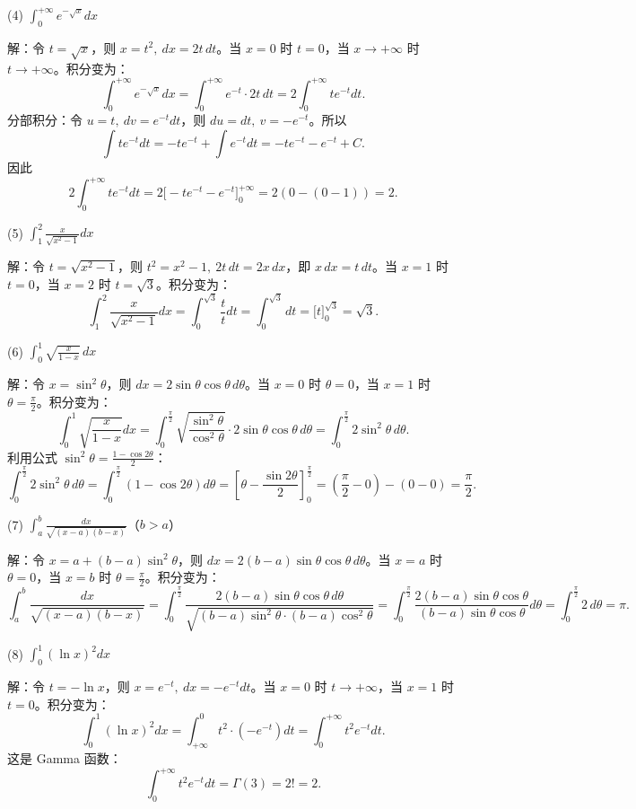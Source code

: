 (4) \(\int_{0}^{+\infty}e^{-\sqrt{x}}dx\)

解：令 \(t=\sqrt{x}\)，则 \(x=t^{2},\ dx=2t\,dt\)。当 \(x=0\) 时 \(t=0\)，当 \(x\to+\infty\) 时 \(t\to+\infty\)。积分变为：
\[ \int_{0}^{+\infty}e^{-\sqrt{x}}dx=\int_{0}^{+\infty}e^{-t}\cdot2t\,dt=2\int_{0}^{+\infty}te^{-t}dt. \]
分部积分：令 \(u=t,\ dv=e^{-t}dt\)，则 \(du=dt,\ v=-e^{-t}\)。所以
\[ \int te^{-t}dt=-te^{-t}+\int e^{-t}dt=-te^{-t}-e^{-t}+C. \]
因此
\[ 2\int_{0}^{+\infty}te^{-t}dt=2\big[-te^{-t}-e^{-t}\big]_{0}^{+\infty}=2\left(0-(0-1)\right)=2. \]

(5) \(\int_{1}^{2}\frac{x}{\sqrt{x^{2}-1}}dx\)

解：令 \(t=\sqrt{x^{2}-1}\)，则 \(t^{2}=x^{2}-1,\ 2t\,dt=2x\,dx\)，即 \(x\,dx=t\,dt\)。当 \(x=1\) 时 \(t=0\)，当 \(x=2\) 时 \(t=\sqrt3\)。积分变为：
\[ \int_{1}^{2}\frac{x}{\sqrt{x^{2}-1}}dx=\int_{0}^{\sqrt3}\frac{t}{t}dt=\int_{0}^{\sqrt3}dt=\big[t\big]_{0}^{\sqrt3}=\sqrt3. \]

(6) \(\int_{0}^{1}\sqrt{\frac{x}{1-x}}\,dx\)

解：令 \(x=\sin^{2}\theta\)，则 \(dx=2\sin\theta\cos\theta\,d\theta\)。当 \(x=0\) 时 \(\theta=0\)，当 \(x=1\) 时 \(\theta=\frac{\pi}{2}\)。积分变为：
\[ \int_{0}^{1}\sqrt{\frac{x}{1-x}}dx=\int_{0}^{\frac{\pi}{2}}\sqrt{\frac{\sin^{2}\theta}{\cos^{2}\theta}}\cdot2\sin\theta\cos\theta\,d\theta=\int_{0}^{\frac{\pi}{2}}2\sin^{2}\theta\,d\theta. \]
利用公式 \(\sin^{2}\theta=\frac{1-\cos2\theta}{2}\)：
\[ \int_{0}^{\frac{\pi}{2}}2\sin^{2}\theta\,d\theta=\int_{0}^{\frac{\pi}{2}}(1-\cos2\theta)d\theta=\left[\theta-\frac{\sin2\theta}{2}\right]_{0}^{\frac{\pi}{2}}=\left(\frac{\pi}{2}-0\right)-(0-0)=\frac{\pi}{2}. \]

(7) \(\int_{a}^{b}\frac{dx}{\sqrt{(x-a)(b-x)}}\)（\(b>a\)）

解：令 \(x=a+(b-a)\sin^{2}\theta\)，则 \(dx=2(b-a)\sin\theta\cos\theta\,d\theta\)。当 \(x=a\) 时 \(\theta=0\)，当 \(x=b\) 时 \(\theta=\frac{\pi}{2}\)。积分变为：
\[ \int_{a}^{b}\frac{dx}{\sqrt{(x-a)(b-x)}}=\int_{0}^{\frac{\pi}{2}}\frac{2(b-a)\sin\theta\cos\theta\,d\theta}{\sqrt{(b-a)\sin^{2}\theta\cdot(b-a)\cos^{2}\theta}}=\int_{0}^{\frac{\pi}{2}}\frac{2(b-a)\sin\theta\cos\theta}{(b-a)\sin\theta\cos\theta}d\theta=\int_{0}^{\frac{\pi}{2}}2\,d\theta=\pi. \]

(8) \(\int_{0}^{1}(\ln x)^{2}dx\)

解：令 \(t=-\ln x\)，则 \(x=e^{-t},\ dx=-e^{-t}dt\)。当 \(x=0\) 时 \(t\to+\infty\)，当 \(x=1\) 时 \(t=0\)。积分变为：
\[ \int_{0}^{1}(\ln x)^{2}dx=\int_{+\infty}^{0}t^{2}\cdot(-e^{-t})dt=\int_{0}^{+\infty}t^{2}e^{-t}dt. \]
这是 Gamma 函数：
\[ \int_{0}^{+\infty}t^{2}e^{-t}dt=\Gamma(3)=2!=2. \]

